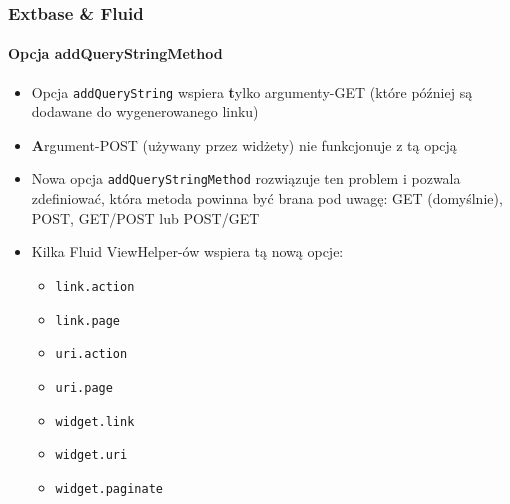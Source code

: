 \begin{frame}[fragile]
	\frametitle{Extbase \& Fluid}
	\framesubtitle{Opcja addQueryStringMethod}

	\begin{itemize}
		\item Opcja \texttt{addQueryString} wspiera \textbf tylko argumenty-{GET}\newline
			\small(które później są dodawane do wygenerowanego linku)\normalsize
		\item \textbf Argument-{POST} (używany przez widżety) nie funkcjonuje z tą opcją
		\item Nowa opcja \texttt{addQueryStringMethod} rozwiązuje ten problem i pozwala zdefiniować, która metoda powinna być brana pod uwagę:\newline
			GET (domyślnie), POST, GET/POST lub POST/GET
		\item Kilka Fluid ViewHelper-ów wspiera tą nową opcje:

			\begin{itemize}\smaller
				\item \texttt{link.action}
				\item \texttt{link.page}
				\item \texttt{uri.action}
				\item \texttt{uri.page}
				\item \texttt{widget.link}
				\item \texttt{widget.uri}
				\item \texttt{widget.paginate}
			\end{itemize}

	\end{itemize}

\end{frame}


